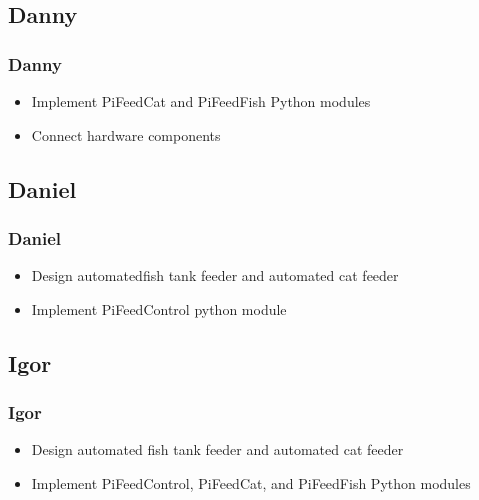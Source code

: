 \documentclass[]{beamer}
\begin{document}
\subsection{Danny}
\begin{frame}
	\frametitle{Danny}
	\begin{itemize}
    	\item Implement PiFeedCat and PiFeedFish Python modules
        \item Connect hardware components
    \end{itemize}
\end{frame}

\subsection{Daniel}
\begin{frame}
	\frametitle{Daniel}
	\begin{itemize}
    	\item Design automatedfish tank feeder and automated cat feeder
        \item Implement PiFeedControl python module
    \end{itemize}
\end{frame}

\subsection{Igor}
\begin{frame}
	\frametitle{Igor}
	\begin{itemize}
    	\item Design automated fish tank feeder and automated cat feeder
        \item Implement PiFeedControl, PiFeedCat, and PiFeedFish Python modules
    \end{itemize}
\end{frame}



\end{document}
